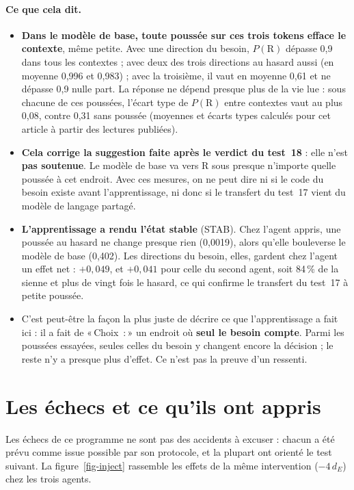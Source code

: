\documentclass[11pt,a4paper]{article}
\newcommand{\Choix}{«\,Choix~:\,»}
\newcommand{\dE}{d_{E}}
\begin{document}
\paragraph{Ce que cela dit.}
\begin{itemize}
\item \textbf{Dans le modèle de base, toute poussée sur ces trois tokens efface le contexte},
même petite. Avec une direction du besoin, $P(\mathrm R)$ dépasse 0,9 dans tous les contextes ;
avec deux des trois directions au hasard aussi (en moyenne 0,996 et 0,983) ; avec la troisième,
il vaut en moyenne 0,61 et ne dépasse 0,9 nulle part. La réponse ne dépend presque plus de la
vie lue : sous chacune de ces poussées, l'écart type de $P(\mathrm R)$ entre contextes vaut au
plus 0,08, contre 0,31 sans poussée (moyennes et écarts types calculés pour cet article à partir
des lectures publiées).
\item \textbf{Cela corrige la suggestion faite après le verdict du test~18} : elle n'est
\textbf{pas soutenue}. Le modèle de base va vers R sous presque n'importe quelle poussée à cet
endroit. Avec ces mesures, on ne peut dire ni si le code du besoin existe avant
l'apprentissage, ni donc si le transfert du test~17 vient du modèle de langage partagé.
\item \textbf{L'apprentissage a rendu l'état stable} (STAB). Chez l'agent appris, une poussée au
hasard ne change presque rien (0,0019), alors qu'elle bouleverse le modèle de base (0,402). Les
directions du besoin, elles, gardent chez l'agent un effet net : $+0,049$, et $+0,041$ pour
celle du second agent, soit 84\,\% de la sienne et plus de vingt fois le hasard, ce qui confirme
le transfert du test~17 à petite poussée.
\item C'est peut-être la façon la plus juste de décrire ce que l'apprentissage a fait ici : il a
fait de \Choix{} un endroit où \textbf{seul le besoin compte}. Parmi les poussées essayées,
seules celles du besoin y changent encore la décision ; le reste n'y a presque plus d'effet.
Ce n'est pas la preuve d'un ressenti.
\end{itemize}

\section{Les échecs et ce qu'ils ont appris}
\label{sec-echecs}

Les échecs de ce programme ne sont pas des accidents à excuser : chacun a été
prévu comme issue possible par son protocole, et la plupart ont orienté le test
suivant. La figure~\ref{fig-inject} rassemble les effets de la même intervention
($-4\,\dE$) chez les trois agents.
\end{document}
